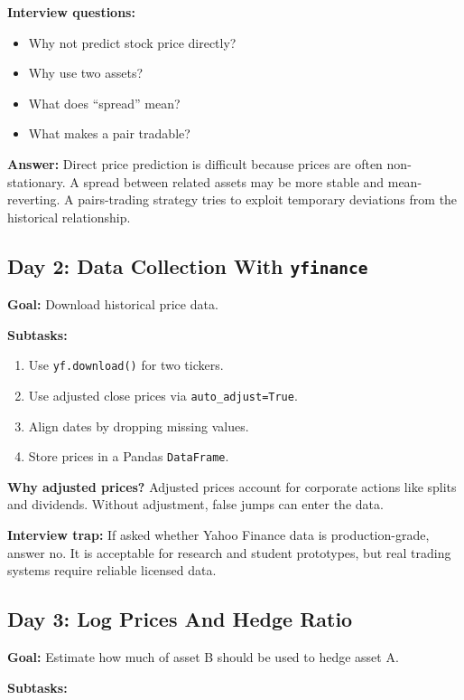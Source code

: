 \documentclass[11pt]{article}
\newcommand{\code}[1]{\texttt{#1}}
\begin{document}
\textbf{Interview questions:}

\begin{itemize}
  \item Why not predict stock price directly?
  \item Why use two assets?
  \item What does ``spread'' mean?
  \item What makes a pair tradable?
\end{itemize}

\textbf{Answer:} Direct price prediction is difficult because prices are often
non-stationary. A spread between related assets may be more stable and
mean-reverting. A pairs-trading strategy tries to exploit temporary deviations
from the historical relationship.

\subsection{Day 2: Data Collection With \code{yfinance}}

\textbf{Goal:} Download historical price data.

\textbf{Subtasks:}

\begin{enumerate}
  \item Use \code{yf.download()} for two tickers.
  \item Use adjusted close prices via \code{auto\_adjust=True}.
  \item Align dates by dropping missing values.
  \item Store prices in a Pandas \code{DataFrame}.
\end{enumerate}

\textbf{Why adjusted prices?} Adjusted prices account for corporate actions like
splits and dividends. Without adjustment, false jumps can enter the data.

\textbf{Interview trap:} If asked whether Yahoo Finance data is production-grade,
answer no. It is acceptable for research and student prototypes, but real
trading systems require reliable licensed data.

\subsection{Day 3: Log Prices And Hedge Ratio}

\textbf{Goal:} Estimate how much of asset B should be used to hedge asset A.

\textbf{Subtasks:}
\end{document}
